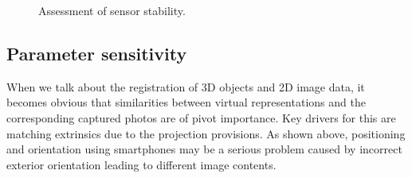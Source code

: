 \documentclass[review]{elsarticle}
\begin{document}
\begin{figure}[htbp!]
\begin{center}
	 	\begin{minipage}{\columnwidth}
	 		\centering
	 	\end{minipage} 
	 	\begin{minipage}{\columnwidth}
	 		\centering
	 	\end{minipage}
		
		\caption{Assessment of sensor stability.}
		\label{fig:sensor_sensi:imu_sensor_stabi_s8_nex5}
\end{center}
\end{figure}

\subsection{Parameter sensitivity}
\label{sec:technology:sensors:sensitivity}
When we talk about the registration of 3D objects and 2D image data, it becomes obvious that similarities between virtual representations and the corresponding captured photos are of pivot importance. Key drivers for this are matching extrinsics due to the projection provisions. As shown above, positioning and orientation using smartphones may be a serious problem caused by incorrect exterior orientation leading to different image contents. 
\end{document}
